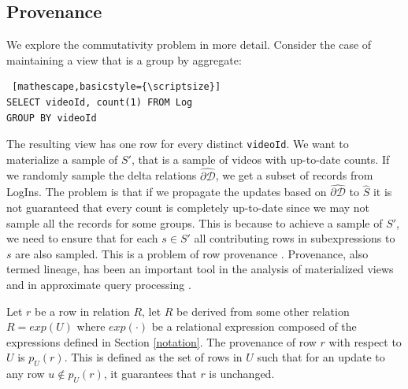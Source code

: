 \subsection{Provenance}
\label{lin}
We explore the commutativity problem in more detail.
Consider the case of maintaining a view that is a group by aggregate:
\begin{lstlisting} [mathescape,basicstyle={\scriptsize}]
SELECT videoId, count(1) FROM Log
GROUP BY videoId
\end{lstlisting}
The resulting view has one row for every distinct \texttt{videoId}.
We want to materialize a sample of $S'$, that is a sample of videos with up-to-date counts.
If we randomly sample the delta relations $\widehat{\partial \mathcal{D}}$, we get a subset of records from LogIns.
The problem is that if we propagate the updates based on $\widehat{\partial \mathcal{D}}$ to $\widehat{S}$ it is not guaranteed that 
every count is completely up-to-date since we may not sample all the records for some groups.
This is because to achieve a sample of $S'$, we need to ensure that for each $s \in S'$ all contributing rows in subexpressions to $s$ are also sampled. 
This is a problem of row provenance \cite{DBLP:journals/vldb/CuiW03}.
Provenance, also termed lineage, has been an important tool in the analysis of materialized views \cite{DBLP:journals/vldb/CuiW03} and in approximate query processing \cite{DBLP:conf/sigmod/ZengGMZ14}.
\begin{definition}[Provenance]\label{prov}
Let $r$ be a row in relation $R$, let $R$ be derived from some other
relation $R = exp(U)$ where $exp(\cdot)$ be a relational
expression composed of the expressions defined in Section \ref{notation}.
The provenance of row $r$ with respect to $U$ is $p_U(r)$. 
This is defined as the set of rows in $U$ such that for an update to any row $u \not\in p_U(r)$, it guarantees that $r$ is unchanged.
\end{definition}

